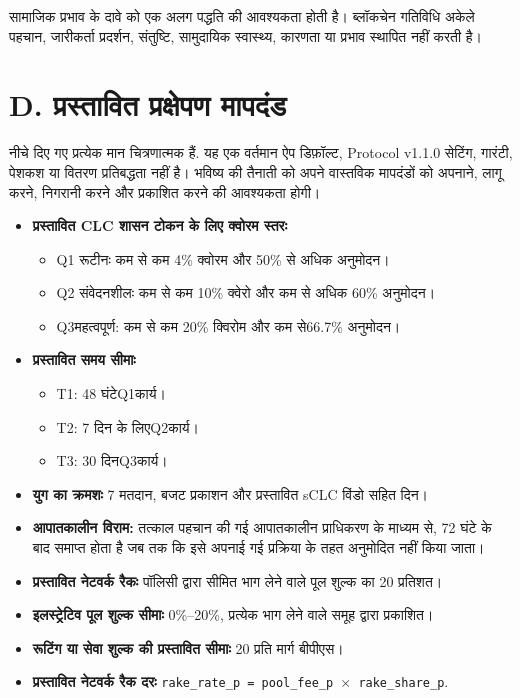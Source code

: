 \documentclass[11pt]{article}
\begin{document}
सामाजिक प्रभाव के दावे को एक अलग पद्धति की आवश्यकता होती है। ब्लॉकचेन गतिविधि अकेले पहचान, जारीकर्ता प्रदर्शन, संतुष्टि, सामुदायिक स्वास्थ्य, कारणता या प्रभाव स्थापित नहीं करती है।


\section*{D. प्रस्तावित प्रक्षेपण मापदंड}

नीचे दिए गए प्रत्येक मान चित्रणात्मक हैं. यह एक वर्तमान ऐप डिफ़ॉल्ट, Protocol v1.1.0 सेटिंग, गारंटी, पेशकश या वितरण प्रतिबद्धता नहीं है। भविष्य की तैनाती को अपने वास्तविक मापदंडों को अपनाने, लागू करने, निगरानी करने और प्रकाशित करने की आवश्यकता होगी।

\begin{itemize}[leftmargin=*]
\item \textbf{प्रस्तावित CLC शासन टोकन के लिए क्वोरम स्तरः}
\begin{itemize}[leftmargin=*]
\item Q1 रूटीनः कम से कम 4\% क्वोरम और 50\% से अधिक अनुमोदन।
\item Q2 संवेदनशीलः कम से कम 10\% क्वेरो और कम से अधिक 60\% अनुमोदन।
\item Q3महत्वपूर्ण: कम से कम 20\% क्विरोम और कम से66.7\% अनुमोदन।
\end{itemize}
\item \textbf{प्रस्तावित समय सीमाः}
\begin{itemize}[leftmargin=*]
\item T1: 48 घंटेQ1कार्य।
\item T2: 7 दिन के लिएQ2कार्य।
\item T3: 30 दिनQ3कार्य।
\end{itemize}
\item \textbf{युग का क्रमशः} 7 मतदान, बजट प्रकाशन और प्रस्तावित sCLC विंडो सहित दिन।
\item \textbf{आपातकालीन विराम:} तत्काल पहचान की गई आपातकालीन प्राधिकरण के माध्यम से, 72 घंटे के बाद समाप्त होता है जब तक कि इसे अपनाई गई प्रक्रिया के तहत अनुमोदित नहीं किया जाता।
\item \textbf{प्रस्तावित नेटवर्क रैकः} पॉलिसी द्वारा सीमित भाग लेने वाले पूल शुल्क का 20 प्रतिशत।
\item \textbf{इलस्ट्रेटिव पूल शुल्क सीमाः} 0\%--20\%, प्रत्येक भाग लेने वाले समूह द्वारा प्रकाशित।
\item \textbf{रूटिंग या सेवा शुल्क की प्रस्तावित सीमाः} 20 प्रति मार्ग बीपीएस।
\item \textbf{प्रस्तावित नेटवर्क रैक दरः} \texttt{rake\_rate\_p = pool\_fee\_p $\times$ rake\_share\_p}.

\end{itemize}
\end{document}
